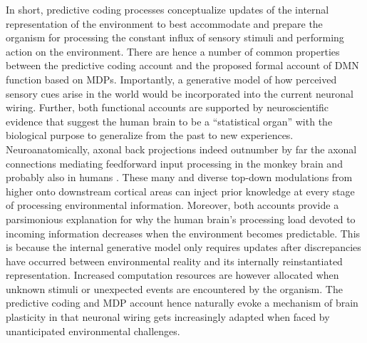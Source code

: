 \documentclass[10pt,letterpaper]{article}
\begin{document}
In short, predictive coding processes
conceptualize updates of the internal representation of the environment
to best accommodate and prepare the organism
for processing the constant influx of sensory stimuli and
performing action on the environment.
There are hence a number of common properties
between the predictive coding account
and the proposed formal account of DMN function based on MDPs.
Importantly,
a generative model of how perceived sensory cues arise in the
world would be incorporated into
the current neuronal wiring.
Further,
both functional accounts are supported by
neuroscientific evidence that suggest
the human brain to be a ``statistical organ'' \citep{friston2014phantastic}
with the biological purpose to
generalize from the past to new experiences.
Neuroanatomically, axonal
back projections indeed outnumber by far the axonal connections mediating feedforward input processing
in the monkey brain and probably also in humans
\citep{salin1995corticocortical}.
These many and diverse top-down modulations
from higher onto downstream cortical areas
can inject prior knowledge
at every stage of processing environmental information.
%
Moreover,
both accounts provide a parsimonious explanation for why the
human brain's processing load devoted to incoming information decreases
when the environment becomes predictable.
This is because the internal generative
model only requires updates after discrepancies have occurred between
environmental reality and its internally reinstantiated representation.
Increased computation resources are however allocated
when unknown stimuli or
unexpected events are encountered by the organism.
The predictive coding and MDP account hence
naturally evoke a mechanism of brain plasticity in that
neuronal wiring gets increasingly adapted
when faced by unanticipated environmental challenges.
\end{document}

